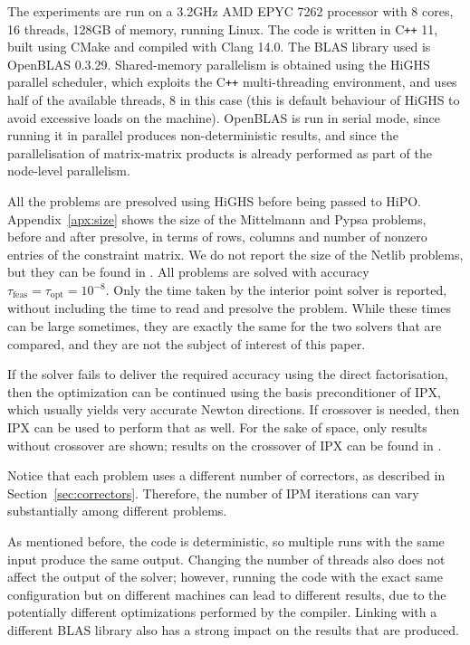 \documentclass[a4paper]{article}
\newcommand{\0}{\mathbf 0}
\newcommand{\cpp}{C\texttt{++} }
\begin{document}
The experiments are run on a 3.2GHz AMD EPYC 7262 processor with 8 cores, 16 threads, 128GB of memory, running Linux.
The code is written in \cpp 11, built using CMake and compiled with Clang 14.0. The BLAS library used is OpenBLAS 0.3.29. Shared-memory parallelism is obtained using the HiGHS parallel scheduler, which exploits the \cpp multi-threading environment, and uses half of the available threads, 8 in this case (this is default behaviour of HiGHS to avoid excessive loads on the machine). OpenBLAS is run in serial mode, since running it in parallel produces non-deterministic results, and since the parallelisation of matrix-matrix products is already performed as part of the node-level parallelism.

All the problems are presolved using HiGHS before being passed to HiPO. Appendix~\ref{apx:size} shows the size of the Mittelmann and Pypsa problems, before and after presolve, in terms of rows, columns and number of nonzero entries of the constraint matrix. We do not report the size of the Netlib problems, but they can be found in \cite{netlib}.
All problems are solved with accuracy $\tau_\text{feas} = \tau_\text{opt} = 10^{-8}$. Only the time taken by the interior point solver is reported, without including the time to read and presolve the problem. While these times can be large sometimes, they are exactly the same for the two solvers that are compared, and they are not the subject of interest of this paper.

If the solver fails to deliver the required accuracy using the direct factorisation, then the optimization can be continued using the basis preconditioner of IPX, which usually yields very accurate Newton directions. If crossover is needed, then IPX can be used to perform that as well. For the sake of space, only results without crossover are shown; results on the crossover of IPX can be found in \cite{SchGon:basisIPM}.

Notice that each problem uses a different number of correctors, as described in Section~\ref{sec:correctors}. Therefore, the number of IPM iterations can vary substantially among different problems.

As mentioned before, the code is deterministic, so multiple runs with the same input produce the same output. Changing the number of threads also does not affect the output of the solver; however, running the code with the exact same configuration but on different machines can lead to different results, due to the potentially different optimizations performed by the compiler. Linking with a different BLAS library also has a strong impact on the results that are produced.
\end{document}
